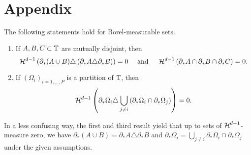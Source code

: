 \chapter{Appendix}

\begin{lemma}
	\label{identities_for_measure_theoretic_boundaries}
	The following statements hold for Borel-measurable sets.
	\begin{enumerate}
		\item 
		\label{item_disjoint_sets}
		If $ A, B, C \subset \operatorname{\mathbb{T}} $ are mutually disjoint, then
		\begin{equation*}	
			\operatorname{\mathcal{H}}^{ d - 1 } \left(
				\partial_{ \ast } ( A \cup B ) 
				\triangle  
				\left( \partial_{ \ast } A \triangle \partial_{ \ast } B \right)
			\right)
			=
			0
			\quad 
			\text{ and }
			\quad
			\operatorname{\mathcal{H}}^{ d - 1 } \left(
				\partial_{ \ast } A
				\cap
				\partial_{ \ast } B
				\cap
				\partial_{ \ast } C
			\right)
			=
			0.
		\end{equation*}
		
		\item 
		\label{rewriting_boundary_via_interfaces}
		If $ ( \Omega_{ i } )_{ i = 1 , \dotsc , P } $ is a partition of $ \operatorname{\mathbb{T}} $, then
		\begin{equation*}
			\operatorname{\mathcal{H}}^{ d - 1 } \left(
				\partial_{ \ast } \Omega_{ i }
				\triangle
				\bigcup_{ j \neq i }
				\left(\partial_{ \ast } \Omega_{ i }
				\cap
				\partial_{ \ast } \Omega_{ j }
				\right)
			\right) = 0.
		\end{equation*}
	\end{enumerate}
\end{lemma}

\begin{remark}
	In a less confusing way, the first and third result yield that up to 
	sets 
	of $ \operatorname{\mathcal{H}}^{ d - 1 } $-measure zero, we have
	$  \partial_{ \ast } ( A \cup B ) 
	=  
	 \partial_{ \ast } A \triangle \partial_{ \ast } B
	$
	and
	$
	\partial_{ \ast } \Omega_{ i }
	=
	\bigcup_{ j \neq i }
	\partial_{ \ast } \Omega_{ i }
	\cap
	\partial_{ \ast } \Omega_{ j }
	$
	under the given assumptions.
\end{remark}

